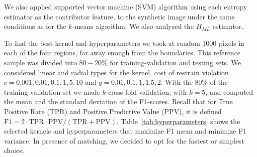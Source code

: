 \documentclass[journal]{IEEEtran}
\begin{document}

We also applied supported vector machine (SVM) algorithm using each entropy estimator as the contributor feature, to the synthetic image under the same conditions as for the $k$-means algorithm. We also analyzed the $H_{ML}$ estimator.

To find the best kernel and hyperparameters we took at random $1000$ pixels in each of the four regions, far away enough from the boundaries. 
This reference sample was divided into $80-20\%$ for training-validation and testing sets. 
We considered linear and radial types for the kernel, cost of restrain violation $c=0.001, 0.01, 0.1, 1, 5, 10$ and $g=0.01, 0.1, 1, 1.5, 2$. With the $80\%$ of the training-validation set we made $k$-cross fold validation, with $k=5$, and computed the mean and the standard deviation of the F1-scores. Recall that for True Positive Rate (TPR) and Positive Predictive Value (PPV), it is defined $\textrm{F1}=2 \cdot \textrm{TPR} \cdot \textrm{PPV} / (\textrm{TPR} + \textrm{PPV})$.
Table~\ref{tab:hyperparameters} shows the selected kernels and hyperparameters that maximize F1 mean and minimize F1 variance. 
In presence of matching, we decided to opt for the fastest or simplest choice.



\end{document}
